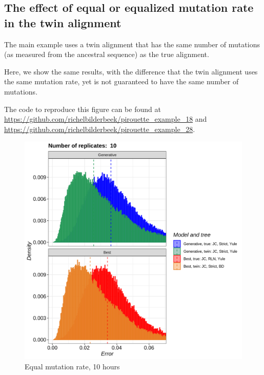 \subsection{The effect of equal or equalized mutation rate in the twin alignment}
\label{subsec:different_n_mutations}
  
The main example uses a twin alignment that has the same number
of mutations (as measured from the ancestral sequence) as the true alignment.

Here, we show the same results, with the difference that
the twin alignment uses the same mutation rate, yet is not guaranteed
to have the same number of mutations.

The code to reproduce this figure can be found at  
\url{https://github.com/richelbilderbeek/pirouette_example_18} and
\url{https://github.com/richelbilderbeek/pirouette_example_28}.

\begin{figure}[H]
  \includegraphics[width=\textwidth]{pirouette_example_18/errors.png}
  \caption{Equal mutation rate, 10 hours}
\end{figure}

